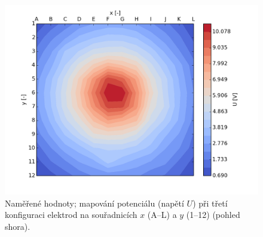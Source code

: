 \documentclass[english]{article}
\begin{document}
	\begin{figure}[h!]
	\begin{center}
	    \vspace*{-0.5cm}
		\includegraphics[width=0.8\linewidth]{../gnuplot/konfigurace_3_map.png}
	    \vspace*{-1cm}
		\caption{Naměřené hodnoty; mapování potenciálu (napětí $U$) při třetí konfiguraci elektrod na souřadnicích $x$ (A--L) a $y$ (1--12) (pohled shora).} 
		\label{fig:g_konf3_mapa}
	\end{center}
	\end{figure}
					
\end{document}

